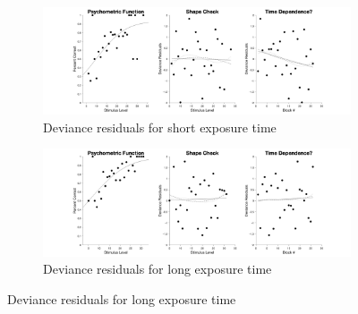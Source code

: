 \documentclass{article}
\begin{document}
\begin{figure}[!hb]
    \begin{subfigure}{\textwidth}
        \centering
        \includegraphics[width = \linewidth]{Thesis/plots/gof/segSize/segSize_eb_short_deviance.png}
        \caption{Deviance residuals for short exposure time}
    \end{subfigure}
    
    \begin{subfigure}{\textwidth}
        \centering
        \includegraphics[width = \linewidth]{Thesis/plots/gof/segSize/segSize_eb_long_deviance.png}
        \caption{Deviance residuals for long exposure time}
    \end{subfigure}
\end{figure}

\clearpage
\end{document}
